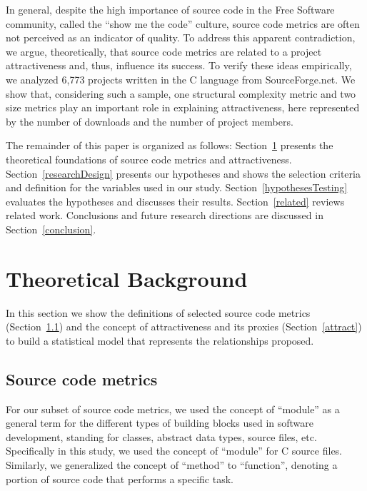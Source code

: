 \documentclass[conference]{IEEEtran}
\newcommand{\TODO}[1]{{\color{red}\textbf{\uwave{#1}}}}
\begin{document}
In general, despite the high importance of source code in the Free Software
community, called the ``show me the code'' culture, source code metrics are
often not perceived as an indicator of quality.
%
To address this apparent contradiction, we argue, theoretically, that source
code metrics are related to a project attractiveness and, thus, influence its success.
%
To verify these ideas empirically, we analyzed 6,773 projects
written in the C language from SourceForge.net.
%
We show that, considering such a sample, one structural complexity metric
and two size metrics play an important role in explaining attractiveness,
here represented by the number of downloads and the number of project members.



The remainder of this paper is organized as follows:
%
Section~\ref{background} presents the theoretical foundations of source code
metrics and attractiveness.
%
Section~\ref{researchDesign} presents our hypotheses and shows the selection
criteria and definition for the variables used in our study.
%
Section~\ref{hypothesesTesting} evaluates the hypotheses and discusses 
their results.
%
Section~\ref{related} reviews related work.
%
Conclusions and future research directions are discussed in Section~\ref{conclusion}.


\section{Theoretical Background}  %
\label{background}

In this section we show the definitions of selected source code metrics (Section~\ref{scm}) and the concept of attractiveness and its proxies (Section~\ref{attract})
to build a statistical model that represents the relationships proposed.

\subsection{Source code metrics}
\label{scm}

For our subset of source code metrics, we used the concept of ``module''
as a general term for the different types of building blocks used in software
development, standing for classes, abstract data types, source files, etc. 
%
Specifically in this study, we used the concept of ``module'' for C source files.
%
Similarly, we generalized the concept of ``method''
to ``function'', denoting a portion of source code that performs a specific task.
\end{document}
